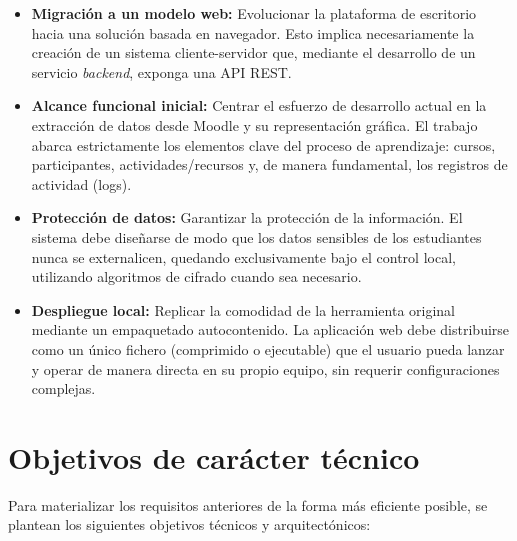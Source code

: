 \begin{itemize}
    \item \textbf{Migración a un modelo web:} Evolucionar la plataforma de escritorio hacia una solución basada en navegador. Esto implica necesariamente la creación de un sistema cliente-servidor que, mediante el desarrollo de un servicio \textit{backend}, exponga una API REST.

    \item \textbf{Alcance funcional inicial:} Centrar el esfuerzo de desarrollo actual en la extracción de datos desde Moodle y su representación gráfica. El trabajo abarca estrictamente los elementos clave del proceso de aprendizaje: cursos, participantes, actividades/recursos y, de manera fundamental, los registros de actividad (logs).

    \item \textbf{Protección de datos:} Garantizar la protección de la información. El sistema debe diseñarse de modo que los datos sensibles de los estudiantes nunca se externalicen, quedando exclusivamente bajo el control local, utilizando algoritmos de cifrado cuando sea necesario.

    \item \textbf{Despliegue local:} Replicar la comodidad de la herramienta original mediante un empaquetado autocontenido. La aplicación web debe distribuirse como un único fichero (comprimido o ejecutable) que el usuario pueda lanzar y operar de manera directa en su propio equipo, sin requerir configuraciones complejas.
\end{itemize}

\section{Objetivos de carácter técnico}

Para materializar los requisitos anteriores de la forma más eficiente posible, se plantean los siguientes objetivos técnicos y arquitectónicos:

